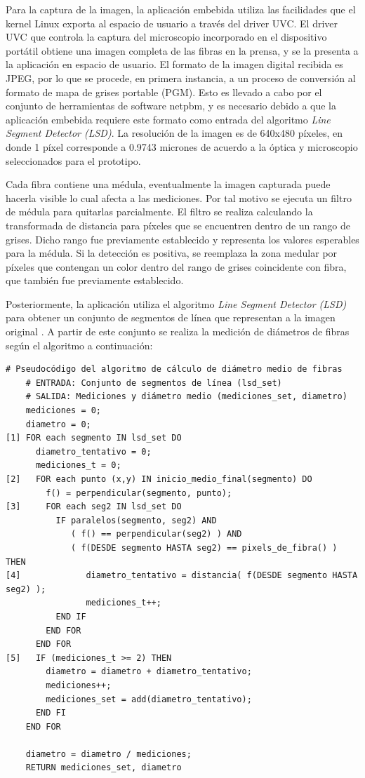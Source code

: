 \documentclass[runningheads,a4paper]{llncs}
\begin{document}
Para la captura de la imagen, la aplicación embebida utiliza las facilidades que el kernel Linux exporta al espacio de usuario a través del driver UVC. El driver UVC que controla la captura del microscopio incorporado en el dispositivo portátil obtiene una imagen completa de las fibras en la prensa, y se la presenta a la aplicación en espacio de usuario.
El formato de la imagen digital recibida es JPEG, por lo que se procede, en primera instancia, a un proceso de conversión al formato de mapa de grises portable (PGM). Esto es llevado a cabo por el conjunto de herramientas de software netpbm, y es necesario debido a que la aplicación embebida requiere este formato como entrada del algoritmo {\it Line Segment Detector (LSD)}.
La resolución de la imagen es de 640x480 píxeles, en donde 1 píxel corresponde a 0.9743 micrones de acuerdo a la óptica y microscopio seleccionados para el prototipo.

Cada fibra contiene una médula, eventualmente la imagen capturada puede hacerla visible lo cual afecta a 
las mediciones. Por tal motivo se ejecuta un filtro de médula para quitarlas parcialmente. El filtro se realiza calculando la transformada de distancia para píxeles que se encuentren dentro de un rango de grises. 
Dicho rango fue previamente establecido y representa los valores esperables para la médula. Si la detección es positiva, se reemplaza la zona medular por píxeles que contengan un color dentro del rango de grises  
coincidente con fibra, que también fue previamente establecido.

Posteriormente, la aplicación utiliza el algoritmo {\it Line Segment Detector (LSD)} para obtener un conjunto de segmentos de línea que representan a la imagen original \cite{lsd}. A partir de este conjunto se 
realiza la medición de diámetros de fibras según el algoritmo a continuación:

\begin{Verbatim}[commandchars=\\\{\}]
    # Pseudocódigo del algoritmo de cálculo de diámetro medio de fibras
    # ENTRADA: Conjunto de segmentos de línea (lsd_set)
    # SALIDA: Mediciones y diámetro medio (mediciones_set, diametro)
    mediciones = 0;
    diametro = 0;
[1] FOR each segmento IN lsd_set DO
      diametro_tentativo = 0;
      mediciones_t = 0;
[2]   FOR each punto (x,y) IN inicio_medio_final(segmento) DO
        f() = perpendicular(segmento, punto);
[3]     FOR each seg2 IN lsd_set DO
          IF paralelos(segmento, seg2) AND 
             ( f() == perpendicular(seg2) ) AND
             ( f(DESDE segmento HASTA seg2) == pixels_de_fibra() ) THEN
[4]             diametro_tentativo = distancia( f(DESDE segmento HASTA seg2) );
                mediciones_t++;
          END IF
        END FOR
      END FOR
[5]   IF (mediciones_t >= 2) THEN 
        diametro = diametro + diametro_tentativo;
        mediciones++;
        mediciones_set = add(diametro_tentativo);
      END FI
    END FOR

    diametro = diametro / mediciones;
    RETURN mediciones_set, diametro
\end{Verbatim}
\end{document}
